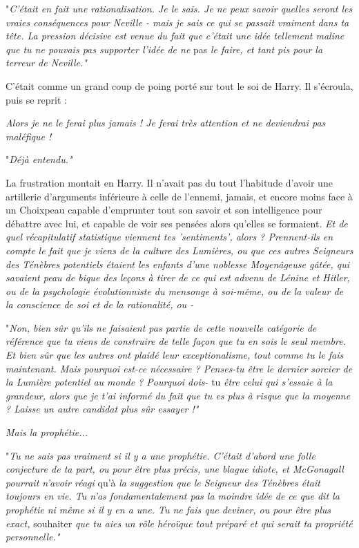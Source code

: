 "\emph{C'était en fait une rationalisation. Je le sais. Je ne peux savoir quelles seront les vraies conséquences pour Neville - mais je sais ce qui se passait vraiment dans ta tête. La pression décisive est venue du fait que c'était une idée tellement maline que tu ne pouvais pas supporter l'idée de ne } pas\emph{ le faire, et tant pis pour la terreur de Neville."} 

C'était comme un grand coup de poing porté sur tout le soi de Harry. Il s'écroula, puis se reprit :

\emph{Alors je ne le ferai plus jamais ! Je ferai très attention et ne deviendrai pas maléfique !} 

"\emph{Déjà entendu."} 

La frustration montait en Harry. Il n'avait pas du tout l'habitude d'avoir une artillerie d'arguments inférieure à celle de l'ennemi, jamais, et encore moins face à un Choixpeau capable d'emprunter tout son savoir et son intelligence pour débattre avec lui, et capable de voir ses pensées alors qu'elles se formaient. \emph{Et de quel récapitulatif statistique viennent tes 'sentiments', alors ? Prennent-ils en compte le fait que je viens de la culture des Lumières, ou que ces autres Seigneurs des Ténèbres potentiels étaient les enfants d'une noblesse Moyenâgeuse gâtée, qui savaient peau de bique des leçons à tirer de ce qui est advenu de Lénine et Hitler, ou de la psychologie évolutionniste du mensonge à soi-même, ou de la valeur de la conscience de soi et de la rationalité, ou -} 

"\emph{Non, bien sûr qu'ils ne faisaient pas partie de cette nouvelle catégorie de référence que tu viens de construire de telle façon que tu en sois le seul membre. Et bien sûr que les autres ont plaidé leur exceptionalisme, tout comme tu le fais maintenant. Mais pourquoi est-ce nécessaire ? Penses-tu être le dernier sorcier de la Lumière potentiel au monde ? Pourquoi dois-} tu\emph{ être celui qui s'essaie à la grandeur, alors que je t'ai informé du fait que tu es plus à risque que la moyenne ? Laisse un autre candidat plus sûr essayer !"} 

\emph{Mais la prophétie...} 

"\emph{Tu ne sais pas vraiment si il y a une prophétie. C'était d'abord une folle conjecture de ta part, ou pour être plus précis, une blague idiote, et McGonagall pourrait n'avoir réagi } qu'à \emph{la suggestion que le Seigneur des Ténèbres était toujours en vie. Tu n'as fondamentalement pas la moindre idée de ce que dit la prophétie ni même si il y en a une. Tu ne fais que deviner, ou pour être plus exact, } souhaiter\emph{ que tu aies un rôle héroïque tout préparé et qui serait ta propriété personnelle."} 

